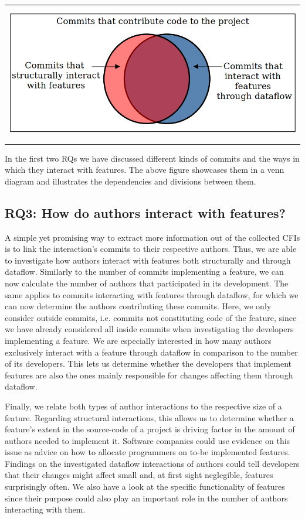 \begin{center}
\begin{tabular}{c}
\includegraphics[height=6cm]{gfx/Commits-of-a-Software-Project.png}
\end{tabular}
\end{center}
In the first two RQs we have discussed different kinds of commits and the ways in which they interact with features. 
The above figure showcases them in a venn diagram and illustrates the dependencies and divisions between them.

\subsection{\textbf{RQ3}: How do authors interact with features?}\label{sec:meth:RQ3}

A simple yet promising way to extract more information out of the collected CFIs is to link the interaction's commits to their respective authors.
Thus, we are able to investigate how authors interact with features both structurally and through dataflow.
Similarly to the number of commits implementing a feature, we can now calculate the number of authors that participated in its development.
The same applies to commits interacting with features through dataflow, for which we can now determine the authors contributing these commits.
Here, we only consider outside commits, i.e. commits not constituting code of the feature, since we have already considered all inside commits when investigating the developers implementing a feature.
We are especially interested in how many authors exclusively interact with a feature through dataflow in comparison to the number of its developers.
This lets us determine whether the developers that implement features are also the ones mainly responsible for changes affecting them through dataflow.

Finally, we relate both types of author interactions to the respective size of a feature.
Regarding structural interactions, this allows us to determine whether a feature's extent in the source-code of a project is driving factor in the amount of authors needed to implement it. 
Software companies could use evidence on this issue as advice on how to allocate programmers on to-be implemented features.
Findings on the investigated dataflow interactions of authors could tell developers that their changes might affect small and, at first sight neglegible, features surprisingly often.
We also have a look at the specific functionality of features since their purpose could also play an important role in the number of authors interacting with them.

